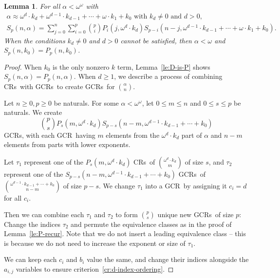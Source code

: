 \documentclass[10pt,a4paper]{article}
\newcommand{\om}{\omega}
\newcommand{\oequiv}{\approx}
\newcommand{\crulenospace}{CR}
\newcommand{\crules}{\crulenospace s~}
\newcommand{\gencrulenospace}{GCR}
\newcommand{\gencrule}{\gencrulenospace~}
\newcommand{\gencrules}{\gencrulenospace s~}
\newcommand{\gencrulesnospace}{\gencrulenospace s}
\newcommand{\numpoints}{n}
\newcommand{\inumpoints}{i}
\newcommand{\idegr}{j}
\newcommand{\commonconst}{a}
\newcommand{\rareconst}{b}
\theoremstyle{plain}
\newtheorem{lemma}[theorem]{Lemma}
\theoremstyle{definition}
\begin{document}
\begin{lemma}
    \label{le:D-recur}
    For all $\alpha < \om^\om$ with \begin{align*}	\alpha \oequiv \om^d \cdot k_d + \om^{d-1} \cdot k_{d-1} + \cdots + \om \cdot k_1 + k_0 \text{ with } k_d \neq 0 \text{ and } d > 0,~~~~~~~~~\\
        S_p\left(\numpoints, \alpha\right) = \sum_{j=0}^{\numpoints} \sum_{i=0}^p \binom{p}{i} P_i\left(j, \om^d \cdot k_d \right) S_{p-i}\left(\numpoints-j, \om^{d-1} \cdot k_{d-1} + \cdots + \om \cdot k_1 + k_0\right).
     \end{align*}
     When the conditions $k_d \neq 0$ and $d > 0$ cannot be satisfied, then $\alpha < \om$ and $S_p(\numpoints, k_0) = P_p(\numpoints, k_0)$.
\end{lemma}
\begin{proof}
When $k_0$ is the only nonzero $k$ term, Lemma~\ref{le:D-is-P} shows $S_p(\numpoints, \alpha) = P_p(\numpoints, \alpha)$. When $d \geq 1$, we describe a process of combining \crules with \gencrules to create \gencrules for $\binom{\alpha}{\numpoints}$.

Let $\numpoints \geq 0, p \geq 0$ be naturals. For some $\alpha < \om^\om$, let $0 \leq m \leq \numpoints$ and $0 \leq s \leq p$ be naturals. We create $$\binom{p}{s} P_s \left( m,\om^{d} \cdot k_d \right) S_{p-s} \left( \numpoints-m,\om^{d-1} \cdot k_{d-1} + \cdots + k_0\right)$$ \gencrulesnospace, with each \gencrule having $m$ elements from the $\om^d  \cdot k_d$ part of $\alpha$ and $\numpoints-m$ elements from parts with lower exponents.

Let $\tau_1$ represent one of the $P_s\left(m, \om^{d} \cdot k_d\right)$ \crules of $\binom{\om^{d}\cdot k_d}{m}$ of size $s$, and $\tau_2$ represent one of the $S_{p-s}\left(\numpoints-m, \om^{d-1} \cdot k_{d-1} + \cdots + k_0\right)$ \gencrules of $\binom{\om^{d-1} \cdot k_{d-1} + \cdots + k_0}{\numpoints-m}$ of size $p-s$. We change $\tau_1$ into a \gencrule by assigning it $c_{\inumpoints} = d$ for all $c_{\inumpoints}$.

Then we can combine each $\tau_1$ and $\tau_2$ to form $\binom{p}{s}$ unique new \gencrules of size $p$: Change the indices $\tau_2$ and permute the equivalence classes as in the proof of Lemma~\ref{le:P-recur}. Note that we do not insert a leading equivalence class -- this is because we do not need to increase the exponent or size of $\tau_1$.

We can keep each $c_{\inumpoints}$ and $\rareconst_{\inumpoints}$ value the same, and change their indices alongside the $\commonconst_{\inumpoints,\idegr}$ variables to ensure criterion~\ref{cr:d-index-ordering}.


\end{proof}
\end{document}
